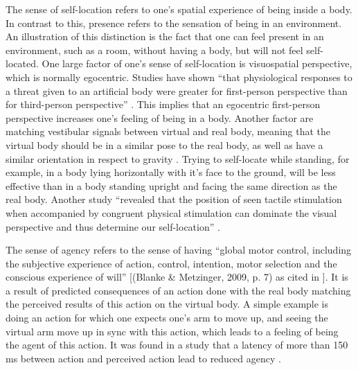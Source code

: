 The sense of self-location refers to one's spatial experience of being inside a body. In contrast to this, presence refers to the sensation of being in an environment. An illustration of this distinction is the fact that one can feel present in an environment, such as a room, without having a body, but will not feel self-located. 
\newline
One large factor of one's sense of self-location is visuospatial perspective, which is normally egocentric. Studies have shown \enquote{that physiological responses to a threat given to an artificial body were greater for first-person perspective than for third-person perspective} \autocite[p. ~4]{senseEmbodimentVR}. This implies that an egocentric first-person perspective increases one's feeling of being in a body.
\newline
Another factor are matching vestibular signals between virtual and real body, meaning that the virtual body should be in a similar pose to the real body, as well as have a similar orientation in respect to gravity \autocite{senseEmbodimentVR}. Trying to self-locate while standing, for example, in a body lying horizontally with it's face to the ground, will be less effective than in a body standing upright and facing the same direction as the real body.
\newline
Another study \enquote{revealed that the position of seen tactile stimulation when accompanied by congruent physical stimulation can dominate the visual perspective and thus determine our self-location} \autocite[p. ~4]{senseEmbodimentVR}.
\newline

The sense of agency refers to the sense of having \enquote{global motor control, including the subjective experience of action, control, intention, motor selection and the conscious experience of will} [(Blanke \& Metzinger, 2009, p. 7) as cited in \autocite[p. ~4]{senseEmbodimentVR}]. It is a result of predicted consequences of an action done with the real body matching the perceived results of this action on the virtual body. A simple example is doing an action for which one expects one's arm to move up, and seeing the virtual arm move up in sync with this action, which leads to a feeling of being the agent of this action. It was found in a study that a latency of more than 150 ms between action and perceived action lead to reduced agency \autocite[p. ~5]{senseEmbodimentVR}.
\newline

